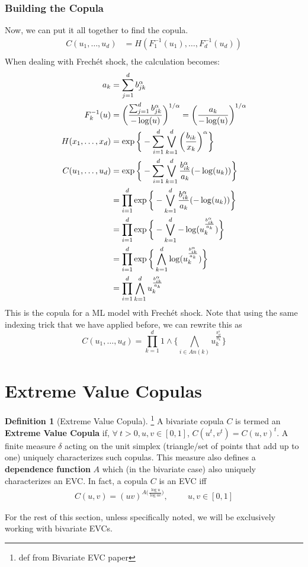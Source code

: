 \documentclass[12pt]{article}
\def\inv{^{-1}}
\newcommand{\ds}{\displaystyle}
\theoremstyle{definition}
\theoremstyle{definition}
\newtheorem{definition}{Definition}
\begin{document}
\subsubsection{Building the Copula}
Now, we can put it all together to find the copula.
\begin{align*}
    C(u_1,\hdots, u_d)&=H(F_1\inv(u_1),\hdots, F_d\inv(u_d))\\
\end{align*}
When dealing with Frechét shock, the calculation becomes:
\begin{align*}
a_k&=\sum_{j=1}^d{b_{jk}^\alpha}\\
F_{k}\inv(u)&=\bigg(\frac{\sum_{j=1}^d{b_{jk}^\alpha}}{-\log(u)} \bigg)^{{1}/{\alpha}}=\bigg(\frac{a_k}{- \log(u)}\bigg)^{1/\alpha}\\
H(x_1,\hdots,x_d)&=\exp\bigg\{ -\sum_{i=1}^d \bigvee_{k=1}^d \bigg( \frac{b_{ik}}{x_k} \bigg)^\alpha \bigg\}\\
     C(u_1,\hdots, u_d)&=\exp\bigg\{ -\sum_{i=1}^d \bigvee_{k=1}^d \frac{b_{ik}^\alpha}{a_k}(-\log(u_k))\bigg\}\\
     &=\prod_{i=1}^d\exp\bigg\{- \bigvee_{k=1}^d \frac{b_{ik}^\alpha}{a_k}(-\log(u_k))\bigg\}\\
     &=\prod_{i=1}^d\exp\bigg\{- \bigvee_{k=1}^d -\log(u_k^\frac{b_{ik}^\alpha}{a_k})\bigg\}\\
     &=\prod_{i=1}^d\exp\bigg\{ \bigwedge_{k=1}^d \log(u_k^\frac{b_{ik}^\alpha}{a_k})\bigg\}\\
     \ds&=\prod_{i=1}^d \bigwedge_{k=1}^d u_k^\frac{b_{ik}^\alpha}{a_k}
\end{align*}
This is the copula for a ML model with Frechét shock. Note that using the same indexing trick that we have applied before, we can rewrite this as
$$C(u_1,\hdots,u_d)=\prod_{k=1}^d 1\wedge\bigg\{ \bigwedge_{i\in An(k)} u_k^\frac{b_{ik}^\alpha}{a_k}\bigg\}$$

\section{Extreme Value Copulas}
\begin{definition}[{Extreme Value Copula}]\footnote{def from Bivariate EVC paper}
A bivariate copula $C$ is termed an \textbf{Extreme Value Copula} if, $\forall \ t>0, u,v\in[0,1]$, $C(u^t,v^t)=C(u,v)^t$. A finite measure $\delta$ acting on the unit simplex (triangle/set of points that add up to one) uniquely characterizes such copulas. This measure also defines a \textbf{dependence function} $A$ which (in the bivariate case) also uniquely characterizes an EVC. In fact, a copula $C$ is an EVC iff
\begin{align*}
    C(u,v)=(uv)^{A\big( \frac{\log u}{\log uv} \big)}, \hspace{1cm} u,v\in[0,1]\tag{1}
\end{align*}
\end{definition}
For the rest of this section, unless specifically noted, we will be exclusively working with bivariate EVCs.
\end{document}
